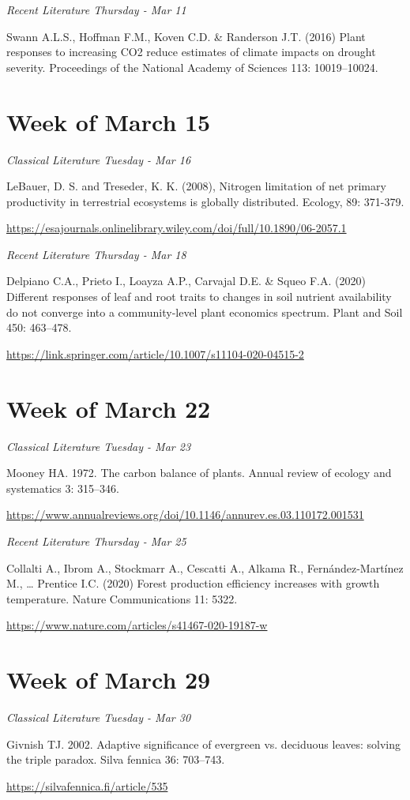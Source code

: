\documentclass[12pt, notitlepage]{article}   	%
\begin{document}
{\textit{Recent Literature Thursday - Mar 11} \par
Swann A.L.S., Hoffman F.M., Koven C.D. & Randerson J.T. (2016) Plant responses to 
increasing CO2 reduce estimates of climate impacts on drought severity. 
Proceedings of the National Academy of Sciences 113: 10019–10024. \par

\section*{Week of March 15}
\textit{Classical Literature Tuesday - Mar 16} \par
LeBauer, D. S. and Treseder, K. K. (2008), Nitrogen limitation of net primary productivity
in terrestrial ecosystems is globally distributed. Ecology, 89: 371-379. \par
\url{https://esajournals.onlinelibrary.wiley.com/doi/full/10.1890/06-2057.1}

\textit{Recent Literature Thursday - Mar 18} \par
Delpiano C.A., Prieto I., Loayza A.P., Carvajal D.E. & Squeo F.A. (2020) 
Different responses of leaf and root traits to changes in soil nutrient availability do 
not converge into a community-level plant economics spectrum. Plant and Soil 450: 463–478. \par
\url{https://link.springer.com/article/10.1007/s11104-020-04515-2}

\section*{Week of March 22}
\textit{Classical Literature Tuesday - Mar 23} \par
Mooney HA. 1972. The carbon balance of plants. 
Annual review of ecology and systematics 3: 315–346. \par
\url{https://www.annualreviews.org/doi/10.1146/annurev.es.03.110172.001531}

\textit{Recent Literature Thursday - Mar 25} \par
Collalti A., Ibrom A., Stockmarr A., Cescatti A., Alkama R., 
Fernández-Martínez M., … Prentice I.C. (2020) 
Forest production efficiency increases with growth temperature. Nature Communications 11: 5322. \par
\url{https://www.nature.com/articles/s41467-020-19187-w}

\section*{Week of March 29}
\textit{Classical Literature Tuesday - Mar 30} \par
Givnish TJ. 2002. Adaptive significance of evergreen vs. deciduous leaves: 
solving the triple paradox. Silva fennica 36: 703–743. \par
\url{https://silvafennica.fi/article/535}

}
\end{document}
